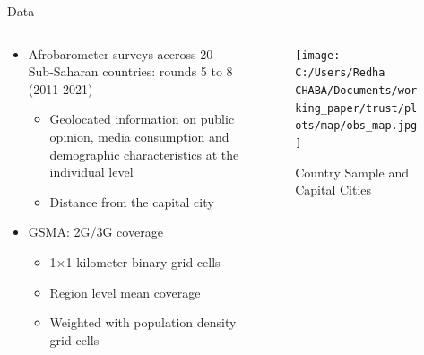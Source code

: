 \documentclass[10pt]{beamer}
\begin{document}
\begin{frame}{Data}
    
    \begin{columns}
    \begin{column}{0.5\textwidth}
    \begin{itemize}\setlength\itemsep{1em}
\setlength\itemsep{1em}
    \item Afrobarometer surveys accross 20 Sub-Saharan countries: rounds 5 to 8 (2011-2021)
    \vspace{0.05cm}
    \begin{itemize}\setlength\itemsep{1em}
\setlength\itemsep{0.05cm}
        \item Geolocated information on public opinion, media consumption and demographic characteristics at the individual level
        \item Distance from the capital city
    \end{itemize}
    \item GSMA: 2G/3G coverage
    \begin{itemize}\setlength\itemsep{1em}
\setlength\itemsep{0.05cm}
        \vspace{0.05cm}
        \item 1×1-kilometer binary grid cells
        \item Region level mean coverage
        \item Weighted with population density grid cells
    \end{itemize}
    \end{itemize}
    
    \end{column}
    \begin{column}{0.5\textwidth}
    
    \begin{figure}
        \centering
        \caption{Country Sample and Capital Cities}
        \texttt{[image: C:/Users/Redha CHABA/Documents/working\_paper/trust/plots/map/obs\_map.jpg]}
    \end{figure}
    \end{column}
        \end{columns}
    \end{frame}
\end{document}
